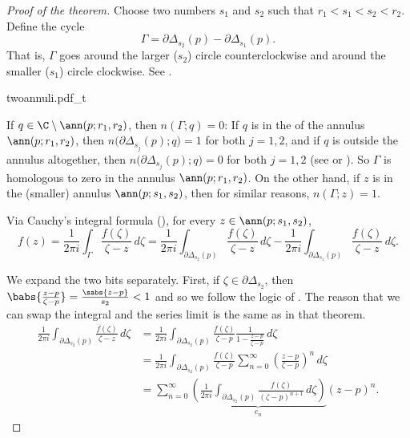 \begin{proof}[Proof of the theorem]
Choose two numbers $s_1$ and $s_2$ such that $r_1 < s_1 < s_2 < r_2$.
Define the cycle
\begin{equation*}
\Gamma = \partial \Delta_{s_2}(p) - \partial \Delta_{s_1}(p) .
\end{equation*}
That is, $\Gamma$ goes around the larger ($s_2$) circle counterclockwise and
around the smaller ($s_1$) circle clockwise.
See .

\begin{myfig}
{twoannuli.pdf_t}
\caption{The two annuli, the smaller annulus is shaded darker.  The two
pieces of $\Gamma$ are noted with the circular arrows.\label{fig:twoannuli}}
\end{myfig}

If $q \in \C \setminus \ann(p;r_1,r_2)$, then $n(\Gamma;q) = 0$:
If $q$ is in the  of the annulus $\ann(p;r_1,r_2)$, then
$n\bigl(\partial \Delta_{s_j}(p);q\bigr) = 1$ for both $j=1,2$, and 
if $q$ is outside the annulus altogether, then
$n\bigl(\partial \Delta_{s_j}(p);q\bigr) = 0$ for both $j=1,2$ 
(see  or
).
So $\Gamma$ is homologous to zero in the annulus $\ann(p;r_1,r_2)$.
On the other hand, if $z$ is in the (smaller) annulus $\ann(p;s_1,s_2)$,
then for similar reasons, $n(\Gamma;z) = 1$.

Via Cauchy's integral formula (), for every $z \in \ann(p;s_1,s_2)$,
\begin{equation*}
f(z) = 
\frac{1}{2\pi i}
\int_{\Gamma} \frac{f(\zeta)}{\zeta-z} \, d\zeta 
=
\frac{1}{2\pi i}
\int_{\partial \Delta_{s_2}(p)} \frac{f(\zeta)}{\zeta-z} \, d\zeta 
-
\frac{1}{2\pi i}
\int_{\partial \Delta_{s_1}(p)} \frac{f(\zeta)}{\zeta-z} \, d\zeta  .
\end{equation*}

We expand the two bits separately.  First,
if $\zeta \in \partial \Delta_{s_2}$, then
$\babs{\frac{z-p}{\zeta-p}} = \frac{\sabs{z-p}}{s_2} < 1$ and so
we follow the logic of .  The reason that we can
swap the integral and the series limit is the same as in that theorem.
\begin{equation*}
\begin{split}
\frac{1}{2\pi i}
\int_{\partial \Delta_{s_2}(p)} \frac{f(\zeta)}{\zeta-z} \, d\zeta 
& =
\frac{1}{2\pi i}
\int_{\partial \Delta_{s_2}(p)} \frac{f(\zeta)}{\zeta-p}
\frac{1}{1-\frac{z-p}{\zeta-p}} \, d\zeta
\\
& =
\frac{1}{2\pi i}
\int_{\partial \Delta_{s_2}(p)} \frac{f(\zeta)}{\zeta-p}
\sum_{n=0}^\infty
{\left(\frac{z-p}{\zeta-p}\right)}^n \, d\zeta
\\
& =
\sum_{n=0}^\infty
\underbrace{
\left(
\frac{1}{2\pi i}
\int_{\partial \Delta_{s_2}(p)} \frac{f(\zeta)}{{(\zeta-p)}^{n+1}}
 \, d\zeta
\right)
}_{c_n}
{(z-p)}^n .
\end{split}
\end{equation*}


\end{proof}

